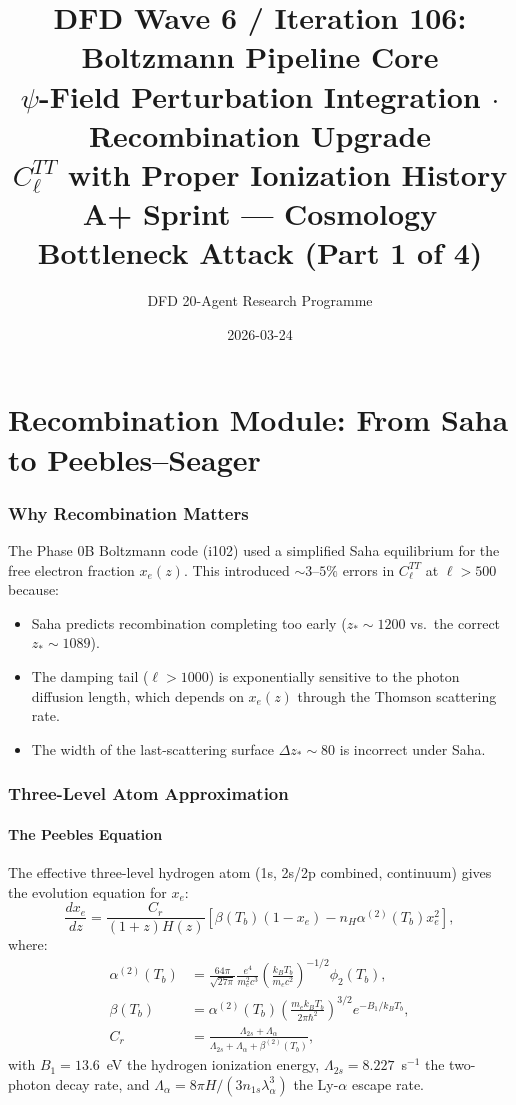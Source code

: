 \documentclass[11pt,a4paper]{article}
\title{DFD Wave 6 / Iteration 106: Boltzmann Pipeline Core\\[6pt]
\large $\psi$-Field Perturbation Integration $\cdot$ Recombination Upgrade\\
$C_\ell^{TT}$ with Proper Ionization History\\[6pt]
\normalsize A+ Sprint --- Cosmology Bottleneck Attack (Part 1 of 4)}
\author{DFD 20-Agent Research Programme}
\date{2026-03-24}
\theoremstyle{remark}
\begin{document}
\maketitle
\tableofcontents
\newpage

\part{Recombination Module: From Saha to Peebles--Seager}
\label{part:recombination}

\section{Why Recombination Matters}

The Phase 0B Boltzmann code (i102) used a simplified Saha equilibrium for
the free electron fraction $x_e(z)$. This introduced $\sim 3$--$5\%$ errors
in $C_\ell^{TT}$ at $\ell > 500$ because:
\begin{itemize}
\item Saha predicts recombination completing too early ($z_* \sim 1200$ vs.\
  the correct $z_* \sim 1089$).
\item The damping tail ($\ell > 1000$) is exponentially sensitive to the
  photon diffusion length, which depends on $x_e(z)$ through the Thomson
  scattering rate.
\item The width of the last-scattering surface $\Delta z_* \sim 80$ is
  incorrect under Saha.
\end{itemize}

\section{Three-Level Atom Approximation}

\subsection{The Peebles Equation}

The effective three-level hydrogen atom (1s, 2s/2p combined, continuum)
gives the evolution equation for $x_e$:
\begin{equation}
\frac{dx_e}{dz} = \frac{C_r}{(1+z)H(z)}
\left[\beta(T_b)(1 - x_e) - n_H\alpha^{(2)}(T_b)x_e^2\right],
\label{eq:peebles}
\end{equation}
where:
\begin{align}
\alpha^{(2)}(T_b) &= \frac{64\pi}{\sqrt{27\pi}}\frac{e^4}{m_e^2 c^3}
\left(\frac{k_B T_b}{m_e c^2}\right)^{-1/2}
\phi_2(T_b), \label{eq:alpha2}\\
\beta(T_b) &= \alpha^{(2)}(T_b)\left(\frac{m_e k_B T_b}{2\pi\hbar^2}\right)^{3/2}
e^{-B_1/k_B T_b}, \label{eq:beta}\\
C_r &= \frac{\Lambda_{2s} + \Lambda_\alpha}{\Lambda_{2s} + \Lambda_\alpha + \beta^{(2)}(T_b)},
\label{eq:Cr}
\end{align}
with $B_1 = 13.6$~eV the hydrogen ionization energy,
$\Lambda_{2s} = 8.227$~s$^{-1}$ the two-photon decay rate, and
$\Lambda_\alpha = 8\pi H/(3n_{1s}\lambda_\alpha^3)$ the Ly-$\alpha$
escape rate.
\end{document}
